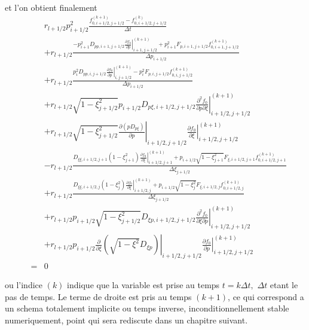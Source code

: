  et l'on obtient finalement \begin{eqnarray*}
 &  & r_{l+1/2}p_{i+1/2}^{2}\frac{f_{0,i+1/2,j+1/2}^{(k+1)}-f_{0,i+1/2,j+1/2}^{(k)}}{\Delta t}\\
 &  & +r_{l+1/2}\frac{-p_{i+1}^{2}D_{pp,i+1,j+1/2}\left.\frac{\partial f_{0}}{\partial p}\right|_{i+1,j+1/2}^{(k+1)}+p_{i+1}^{2}F_{p,i+1,j+1/2}f_{0,i+1,j+1/2}^{(k+1)}}{\Delta p_{i+1/2}}\\
 &  & +r_{l+1/2}\frac{p_{i}^{2}D_{pp,i,j+1/2}\left.\frac{\partial f_{0}}{\partial p}\right|_{i,j+1/2}^{(k+1)}-p_{i}^{2}F_{p,i,j+1/2}f_{0,i,j+1/2}^{(k+1)}}{\Delta p_{i+1/2}}\\
 &  & +r_{l+1/2}\sqrt{1-\xi_{j+1/2}^{2}}p_{i+1/2}D_{p\xi,i+1/2,j+1/2}\left.\frac{\partial^{2}f_{0}}{\partial p\partial\xi}\right|_{i+1/2,j+1/2}^{(k+1)}\\
 &  & +r_{l+1/2}\sqrt{1-\xi_{j+1/2}^{2}}\left.\frac{\partial\left(pD_{p\xi}\right)}{\partial p}\right|_{i+1/2,j+1/2}\left.\frac{\partial f_{0}}{\partial\xi}\right|_{i+1/2,j+1/2}^{(k+1)}\\
 &  & -r_{l+1/2}\frac{D_{\xi\xi,i+1/2,j+1}\left(1-\xi_{j+1}^{2}\right)\left.\frac{\partial f_{0}}{\partial\xi}\right|_{i+1/2,j+1}^{(k+1)}+p_{i+1/2}\sqrt{1-\xi_{j+1}^{2}}F_{\xi,i+1/2,j+1}f_{0,i+1/2,j+1}^{(k+1)}}{\Delta\xi_{j+1/2}}\\
 &  & +r_{l+1/2}\frac{D_{\xi\xi,i+1/2,j}\left(1-\xi_{j}^{2}\right)\left.\frac{\partial f_{0}}{\partial\xi}\right|_{i+1/2,j}^{(k+1)}+p_{i+1/2}\sqrt{1-\xi_{j}^{2}}F_{\xi,i+1/2,j}f_{0,i+1/2,j}^{(k+1)}}{\Delta\xi_{j+1/2}}\\
 &  & +r_{l+1/2}p_{i+1/2}\sqrt{1-\xi_{j+1/2}^{2}}D_{\xi p,i+1/2,j+1/2}\left.\frac{\partial^{2}f_{0}}{\partial\xi\partial p}\right|_{i+1/2,j+1/2}^{(k+1)}\\
 &  & +r_{l+1/2}p_{i+1/2}\left.\frac{\partial}{\partial\xi}\left(\sqrt{1-\xi^{2}}D_{\xi p}\right)\right|_{i+1/2,j+1/2}\left.\frac{\partial f_{0}}{\partial p}\right|_{i+1/2,j+1/2}^{(k+1)}\\
 & = & 0\end{eqnarray*}


ou l'indice $(k)$ indique que la variable est prise au temps $t=k\Delta t,$
$\Delta t$ etant le pas de temps. Le terme de droite est pris au
temps $(k+1)$, ce qui correspond a un schema totalement implicite
ou temps inverse, inconditionnellement stable numeriquement, point
qui sera rediscute dans un chapitre suivant.

